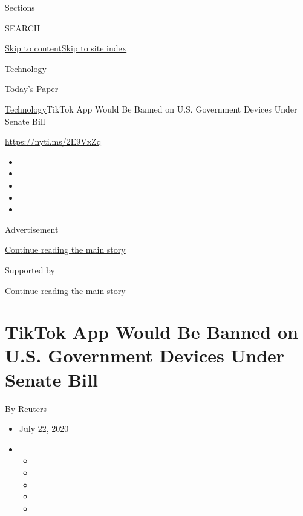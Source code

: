 Sections

SEARCH

\protect\hyperlink{site-content}{Skip to
content}\protect\hyperlink{site-index}{Skip to site index}

\href{https://www.nytimes.com/section/technology}{Technology}

\href{https://myaccount.nytimes.com/auth/login?response_type=cookie\&client_id=vi}{}

\href{https://www.nytimes.com/section/todayspaper}{Today's Paper}

\href{/section/technology}{Technology}\textbar{}TikTok App Would Be
Banned on U.S. Government Devices Under Senate Bill

\url{https://nyti.ms/2E9VxZq}

\begin{itemize}
\item
\item
\item
\item
\item
\end{itemize}

Advertisement

\protect\hyperlink{after-top}{Continue reading the main story}

Supported by

\protect\hyperlink{after-sponsor}{Continue reading the main story}

\hypertarget{tiktok-app-would-be-banned-on-us-government-devices-under-senate-bill}{%
\section{TikTok App Would Be Banned on U.S. Government Devices Under
Senate
Bill}\label{tiktok-app-would-be-banned-on-us-government-devices-under-senate-bill}}

By Reuters

\begin{itemize}
\item
  July 22, 2020
\item
  \begin{itemize}
  \item
  \item
  \item
  \item
  \item
  \end{itemize}
\end{itemize}

